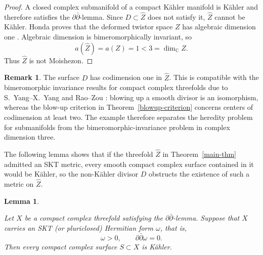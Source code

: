 \documentclass[11pt]{amsart}
\numberwithin{equation}{section}
\def\mb{\mathbb}
\theoremstyle{plain}
\newtheorem{lemma}[thm]{Lemma}
\theoremstyle{definition}
\newtheorem{rem}[thm]{Remark}
\begin{document}
\begin{proof}
A closed complex submanifold of a compact K\"ahler manifold is K\"ahler and
therefore satisfies the $\partial\bar\partial$-lemma.  Since
$D\subset\widehat Z$ does not satisfy it, $\widehat Z$ cannot be K\"ahler.
Honda proves that the deformed twistor space $Z$ has algebraic dimension one
\cite[Proposition 3.1 and the discussion following it]{Hn15}.
Algebraic dimension is bimeromorphically invariant, so
\[
 a(\widehat Z)=a(Z)=1<3=\dim_{\mb C}\widehat Z.
\]
Thus $\widehat Z$ is not Moishezon.
\end{proof}

\begin{rem}\label{codimension-remark}
The surface $D$ has codimension one in $\widehat Z$.  This is compatible with
the bimeromorphic invariance results for compact complex threefolds due to
S.~Yang--X.~Yang \cite[Theorem 1.3]{YY20} and Rao--Zou
\cite[Corollary 5.4]{RZ24}: blowing up a
smooth divisor is an isomorphism, whereas the blow-up criterion in
Theorem~\ref{blowup-criterion} concerns centers of codimension at least two.  The
example therefore separates the heredity problem for submanifolds from the
bimeromorphic-invariance problem in complex dimension three.
\end{rem}


The following lemma shows that if the threefold $\widehat Z$ in
Theorem~\ref{main-thm} admitted an SKT metric, every smooth compact complex
surface contained in it  would be K\"ahler, so the non-K\"ahler divisor $D$
obstructs the existence of such a metric on $\widehat Z$. 

\begin{lemma}\label{skt-surface-kahler}


Let $X$ be a compact complex threefold satisfying the
$\partial\bar\partial$-lemma.  Suppose that $X$ carries an \emph{SKT (or
pluriclosed) Hermitian form} $\omega$, that is,
\[
 \omega>0,
 \qquad
 \partial\bar\partial\omega=0.
\]
Then every compact complex surface $S\subset X$ is K\"ahler.
\end{lemma}
\end{document}
